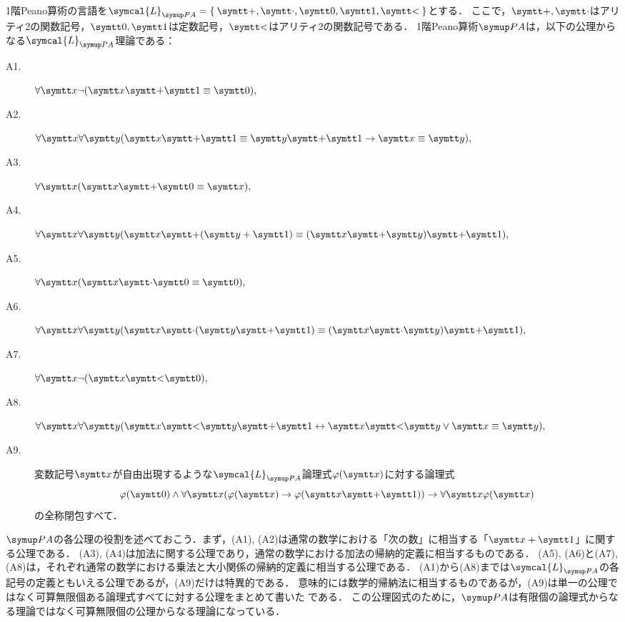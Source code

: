 \begin{Def} \label{Def:peanoarithmetic}
	1階Peano算術の言語を\(\symcal{L}_{\PA} = \Set{\obj{+}, \obj{\cdot}, \obj{0}, \obj{1}, \obj{<}}\)とする．
	ここで，\(\obj{+}, \obj{\cdot}\)はアリティ2の関数記号，\(\obj{0}, \obj{1}\)は定数記号，\(\obj{<}\)はアリティ2の関数記号である．
	1階Peano算術\(\PA\)は，以下の公理からなる\(\symcal{L}_{\PA}\)理論である：
	\begin{description}
		\item[A1.] \(\forall \obj{x} \lnot \paren{\obj{x} \obj{+} \obj{1} \objeq \obj{0}},\)
		\item[A2.] \(\forall \obj{x} \forall \obj{y} \paren{\obj{x} \obj{+} \obj{1} \objeq \obj{y} \obj{+} \obj{1} \to \obj{x} \objeq \obj{y}},\)
		\item[A3.] \(\forall \obj{x} \paren{\obj{x} \obj{+} \obj{0} \objeq \obj{x}},\)
		\item[A4.] \(\forall \obj{x} \forall \obj{y} \paren{\obj{x} \obj{+} \paren{\obj{y} + \obj{1}} \objeq \paren{\obj{x} \obj{+} \obj{y}} \obj{+} \obj{1}},\)
		\item[A5.] \(\forall \obj{x} \paren{\obj{x} \obj{\cdot} \obj{0} \objeq \obj{0}},\)
		\item[A6.] \(\forall \obj{x} \forall \obj{y} \paren{\obj{x} \obj{\cdot} \paren{\obj{y} \obj{+} \obj{1}} \objeq \paren{\obj{x} \obj{\cdot} \obj{y}} \obj{+} \obj{1}},\)
		\item[A7.] \(\forall \obj{x} \lnot \paren{\obj{x} \obj{<} \obj{0}},\)
		\item[A8.] \(\forall \obj{x} \forall \obj{y} \paren{\obj{x} \obj{<} \obj{y} \obj{+} \obj{1} \formulaequiv \obj{x} \obj{<} \obj{y} \lor \obj{x} \objeq \obj{y}},\)
		\item[A9.] 変数記号\(\obj{x}\)が自由出現するような\(\symcal{L}_{\PA}\)論理式\(\apply{\varphi}{\obj{x}}\)に対する論理式
		      \begin{equation}
			      \apply{\varphi}{\obj{0}} \land \forall \obj{x} \paren{\apply{\varphi}{\obj{x}} \to \apply{\varphi}{\obj{x} \obj{+} \obj{1}}} \to \forall \obj{x} \apply{\varphi}{\obj{x}}
			      \label{eq:inductionscheme}
		      \end{equation}
		      の全称閉包すべて．
	\end{description}
\end{Def}

\(\PA\)の各公理の役割を述べておこう．まず，(A1), (A2)は通常の数学における「次の数」に相当する「\(\obj{x} + \obj{1}\)」に関する公理である．
(A3), (A4)は加法に関する公理であり，通常の数学における加法の帰納的定義に相当するものである．
(A5), (A6)と(A7), (A8)は，それぞれ通常の数学における乗法と大小関係の帰納的定義に相当する公理である．
(A1)から(A8)までは\(\symcal{L}_{\PA}\)の各記号の定義ともいえる公理であるが，(A9)だけは特異的である．
意味的には数学的帰納法に相当するものであるが，(A9)は単一の公理ではなく可算無限個ある論理式すべてに対する公理をまとめて書いた%
%
である．
この公理図式のために，\(\PA\)は有限個の論理式からなる理論ではなく可算無限個の公理からなる理論になっている．

